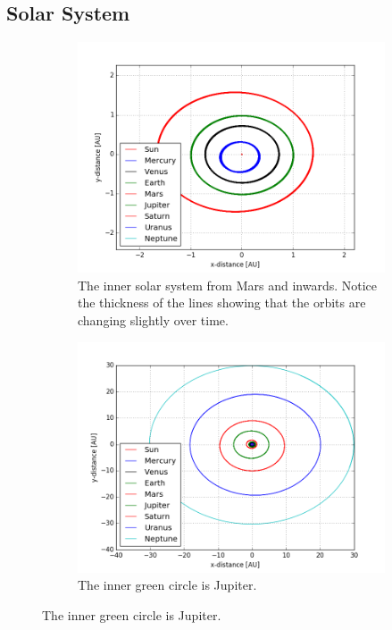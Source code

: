 \documentclass[10pt,showpacs,preprintnumbers,footinbib,amsmath,amssymb,aps,prl,twocolumn,groupedaddress,superscriptaddress,showkeys]{revtex4-1}
\begin{document}
\subsection{Solar System}
\begin{figure}
	\centering
	\begin{subfigure}[b]{0.4\textwidth}
		\includegraphics[width = \linewidth]{system_close}
		\caption{The inner solar system from Mars and inwards. Notice the thickness of the lines showing that the orbits are changing slightly over time.}
		\label{fig:system_all_a}
	\end{subfigure}
	
    \begin{subfigure}[b]{0.4\textwidth}
		\includegraphics[width = \linewidth]{system_all}
		\caption{The inner green circle is Jupiter.}
		\label{fig:system_all_c}
	\end{subfigure}
	

\end{figure}
\end{document}
